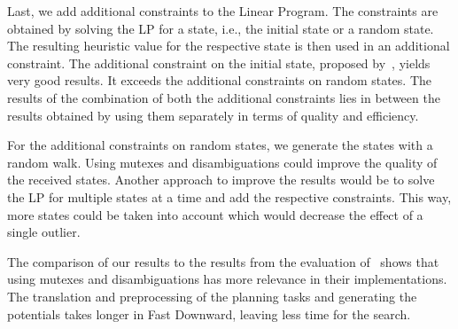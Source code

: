 Last, we add additional constraints to the Linear Program.
The constraints are obtained by solving the LP for a state, i.e., the initial state or a random state.
The resulting heuristic value for the respective state is then used in an additional constraint.
The additional constraint on the initial state, proposed by~\citeauthor{fivser2020strengthening}, yields very good results.
It exceeds the additional constraints on random states.
The results of the combination of both the additional constraints lies in between the results obtained by using them separately in terms of quality and efficiency.

For the additional constraints on random states, we generate the states with a random walk.
Using mutexes and disambiguations could improve the quality of the received states.
Another approach to improve the results would be to solve the LP for multiple states at a time and add the respective constraints.
This way, more states could be taken into account which would decrease the effect of a single outlier.

The comparison of our results to the results from the evaluation of~\citeauthor{fivser2020strengthening} shows that using mutexes and disambiguations has more relevance in their implementations.
The translation and preprocessing of the planning tasks and generating the potentials takes longer in Fast Downward, leaving less time for the search.
